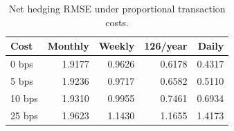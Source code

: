 \begin{table}[H]
\centering
\caption{Net hedging RMSE under proportional transaction costs.}
\label{tab:tc_appendix}
\begin{tabular}{lrrrr}
\toprule
Cost & Monthly & Weekly & 126/year & Daily \\
\midrule
0 bps & 1.9177 & 0.9626 & 0.6178 & 0.4317 \\
5 bps & 1.9236 & 0.9717 & 0.6582 & 0.5110 \\
10 bps & 1.9310 & 0.9955 & 0.7461 & 0.6934 \\
25 bps & 1.9623 & 1.1430 & 1.1655 & 1.4173 \\
\bottomrule
\end{tabular}
\end{table}
